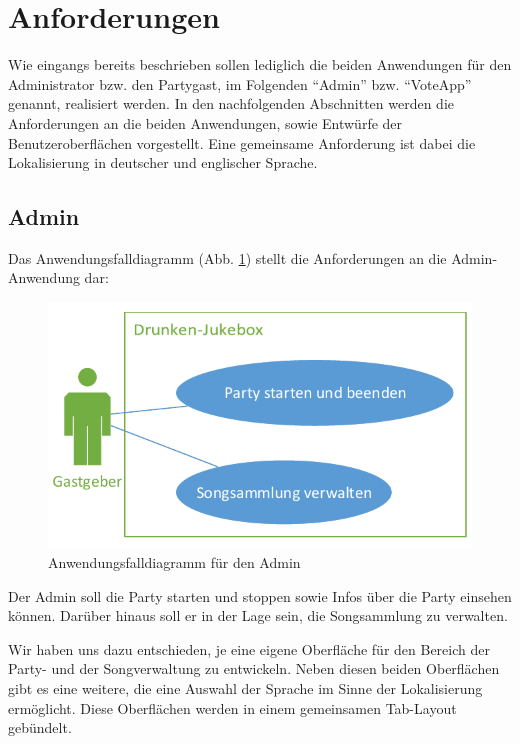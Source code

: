 \newpage
\section{Anforderungen}
\label{sec:Anforderungen}
Wie eingangs bereits beschrieben sollen lediglich die beiden Anwendungen für den Administrator bzw. den Partygast, im Folgenden "`Admin"' bzw. "`VoteApp"' genannt, realisiert werden. In den nachfolgenden Abschnitten werden die Anforderungen an die beiden Anwendungen, sowie Entwürfe der Benutzeroberflächen vorgestellt. Eine gemeinsame Anforderung ist dabei die Lokalisierung in deutscher und englischer Sprache.

\subsection{Admin}
Das Anwendungsfalldiagramm (Abb. \ref{fig:AdminUseCase}) stellt die Anforderungen an die Admin-Anwendung dar:

\begin{figure}[H]
\centering
\includegraphics[width=0.7\linewidth]{Bilder/AdminUseCase}
\caption{Anwendungsfalldiagramm für den Admin}
\label{fig:AdminUseCase}
\end{figure}


Der Admin soll die Party starten und stoppen sowie Infos über die Party einsehen können. Darüber hinaus soll er in der Lage sein, die Songsammlung zu verwalten.

Wir haben uns dazu entschieden, je eine eigene Oberfläche für den Bereich der Party- und der Songverwaltung zu entwickeln. Neben diesen beiden Oberflächen gibt es eine weitere, die eine Auswahl der Sprache im Sinne der Lokalisierung ermöglicht. Diese Oberflächen werden in einem gemeinsamen Tab-Layout gebündelt.
  
